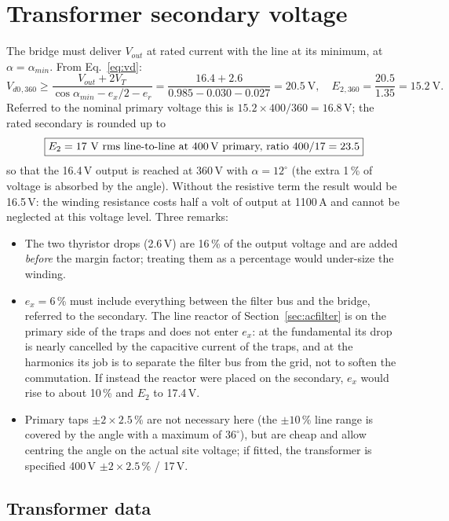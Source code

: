 \documentclass[11pt,a4paper]{article}
\newcommand{\Vdo}{V_{d0}}
\newcommand{\ex}{e_x}
\newcommand{\Ell}{E_{2}}
\begin{document}
\section{Transformer secondary voltage}
\label{sec:e2}

The bridge must deliver $V_{out}$ at rated current with the line at its minimum, at $\alpha = \alpha_{min}$. From Eq.~\eqref{eq:vd}:
\begin{equation}
\Vdo{}_{,360} \ge \frac{V_{out} + 2V_T}{\cos\alpha_{min} - \ex/2 - e_r}
= \frac{16.4 + 2.6}{0.985 - 0.030 - 0.027} = 20.5\ \text{V},
\quad
\Ell{}_{,360} = \frac{20.5}{1.35} = 15.2\ \text{V}.
\label{eq:e2}
\end{equation}
Referred to the nominal primary voltage this is $15.2 \times 400/360 = 16.8$\,V; the rated secondary is rounded up to
\[
\boxed{\Ell = 17\ \text{V rms line-to-line at 400\,V primary, ratio } 400/17 = 23.5}
\]
so that the 16.4\,V output is reached at 360\,V with $\alpha = 12^\circ$ (the extra 1\,\% of voltage is absorbed by the angle). Without the resistive term the result would be 16.5\,V: the winding resistance costs half a volt of output at 1100\,A and cannot be neglected at this voltage level. Three remarks:

\begin{itemize}
\item The two thyristor drops (2.6\,V) are 16\,\% of the output voltage and are added \emph{before} the margin factor; treating them as a percentage would under-size the winding.
\item $\ex = 6$\,\% must include everything between the filter bus and the bridge, referred to the secondary. The line reactor of Section~\ref{sec:acfilter} is on the primary side of the traps and does not enter $\ex$: at the fundamental its drop is nearly cancelled by the capacitive current of the traps, and at the harmonics its job is to separate the filter bus from the grid, not to soften the commutation. If instead the reactor were placed on the secondary, $\ex$ would rise to about 10\,\% and $\Ell$ to 17.4\,V.
\item Primary taps $\pm2\times2.5$\,\% are not necessary here (the $\pm10$\,\% line range is covered by the angle with a maximum of $36^\circ$), but are cheap and allow centring the angle on the actual site voltage; if fitted, the transformer is specified 400\,V $\pm2\times2.5$\,\% / 17\,V.
\end{itemize}

\subsection{Transformer data}
\end{document}
